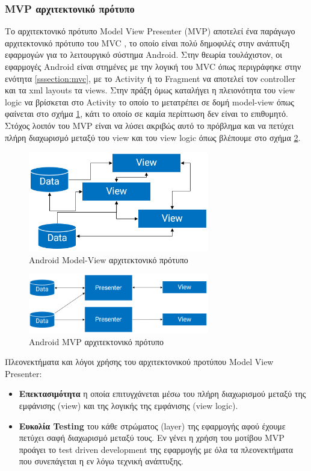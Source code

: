 	\subsubsection{MVP αρχιτεκτονικό πρότυπο}
	Το αρχιτεκτονικό πρότυπο Model View Presenter (MVP) αποτελεί ένα παράγωγο αρχιτεκτονικό πρότυπο του MVC \cite{mvpPotel}, το οποίο είναι πολύ δημοφιλές στην ανάπτυξη εφαρμογών για το λειτουργικό σύστημα Android. Στην θεωρία τουλάχιστον, οι εφαρμογές Android είναι στημένες με την λογική του MVC \cite{androidArchAnalysis} όπως περιγράφηκε στην ενότητα \ref{sssection:mvc}, με το Activity ή το Fragment να αποτελεί τον controller και τα xml layouts τα views. Στην πράξη όμως καταλήγει η πλειονότητα του view logic να βρίσκεται στο Activity το οποίο το μετατρέπει σε δομή model-view όπως φαίνεται στο σχήμα \ref{fig:model_view}, κάτι το οποίο σε καμία περίπτωση δεν είναι το επιθυμητό. Στόχος λοιπόν του MVP είναι να λύσει ακριβώς αυτό το πρόβλημα και να πετύχει πλήρη διαχωρισμό μεταξύ του view και του view logic όπως βλέπουμε στο σχήμα \ref{fig:mvp_pattern}.
		
	 \begin{figure}[h]
	    \centering
	    \includegraphics[width=0.7\textwidth]{model_view.png}
	    \caption{Android Model-View αρχιτεκτονικό πρότυπο}
	    \label{fig:model_view}
	\end{figure}
	
	\begin{figure}[h]
	    \centering
	    \includegraphics[width=0.7\textwidth]{mvp_pattern.png}
	    \caption{Android MVP αρχιτεκτονικό πρότυπο}
	    \label{fig:mvp_pattern}
	\end{figure}
	
	Πλεονεκτήματα και λόγοι χρήσης του αρχιτεκτονικού προτύπου Model View Presenter\cite{androidHacks}:
	\begin{itemize}
		\item \textbf{Επεκτασιμότητα} η οποία επιτυγχάνεται μέσω του πλήρη διαχωρισμού μεταξύ της εμφάνισης (view) και της λογικής της εμφάνισης (view logic). 
		\item \textbf{Ευκολία Testing} του κάθε στρώματος (layer) της εφαρμογής αφού έχουμε πετύχει σαφή διαχωρισμό μεταξύ τους. Εν γένει η χρήση του μοτίβου MVP προάγει το test driven development της εφαρμογής με όλα τα πλεονεκτήματα που συνεπάγεται η εν λόγω τεχνική ανάπτυξης.
	\end{itemize}
	
